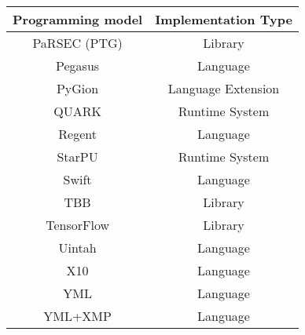 \begin{tabular}{cc}
\hline
Programming model & Implementation Type \\
\hline
PaRSEC (PTG) & Library\\
Pegasus & Language\\
PyGion & Language Extension\\
QUARK & Runtime System\\
Regent & Language\\
StarPU & Runtime System\\
Swift & Language\\
TBB & Library\\
TensorFlow & Library\\
Uintah & Language\\
X10 & Language\\
YML & Language\\
YML+XMP & Language\\
\hline
\end{tabular}
